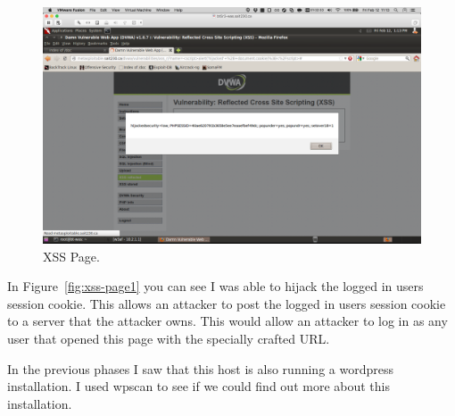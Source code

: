 \documentclass{article}
\begin{document}
\begin{figure}[h!]
	\includegraphics[width=\linewidth]{images/dvwa-xss-page-exploit.png}
	\caption{XSS Page.}
	\label{fig:xss-page2}
\end{figure}

In Figure~\ref{fig:xss-page1} you can see I was able to hijack the logged
in users session cookie. This allows an attacker to post the logged in
users session cookie to a server that the attacker owns. This would allow
an attacker to log in as any user that opened this page with the specially
crafted URL.


In the previous phases I saw that this host is also running a wordpress
installation. I used wpscan to see if we could find out more about this installation.
\end{document}
